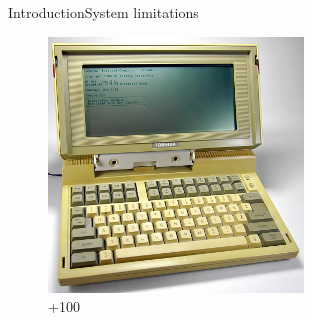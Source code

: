 \begin{frame}{Introduction}{System limitations}
\begin{figure}[ht]
\begin{minipage}[b]{0.3\linewidth}
\includegraphics[width=\textwidth]{img/introduction/laptop.png}
\\{\color{green}+100}
\end{minipage}

\end{figure}

\end{frame}

